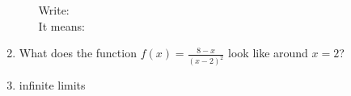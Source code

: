 \documentclass[11pt,fleqn]{article}
\begin{document}
\begin{enumerate}
\begin{itemize}
Write: \\

It means: \\
\vspace{0.5in}
	\end{itemize}
	
\item {} What does the function $f(x) = \frac{8-x}{(x-2)^2}$ look like around $x=2$?
\vfill

\item {} infinite limits\\

\vspace{.3in}
\newpage

%
%
%
%
%
%
%
%
%
%
%
%

\end{enumerate}
\end{document}
